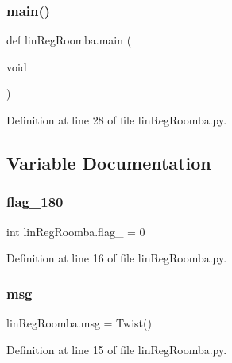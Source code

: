 \mbox{\label{namespacelinRegRoomba_af5e99ac36e42ad425a87275a39d7f297}} 
\subsubsection{\texorpdfstring{main()}{main()}}
{\footnotesize\ttfamily def lin\+Reg\+Roomba.\+main (\begin{DoxyParamCaption}\item[{void}]{ }\end{DoxyParamCaption})}



Definition at line 28 of file lin\+Reg\+Roomba.\+py.



\subsection{Variable Documentation}
\mbox{\label{namespacelinRegRoomba_ab69f9401c1bcd62410c52e043cee85ae}} 
\subsubsection{\texorpdfstring{flag\_180}{flag\_180}}
{\footnotesize\ttfamily int lin\+Reg\+Roomba.\+flag\+\_ = 0}



Definition at line 16 of file lin\+Reg\+Roomba.\+py.

\mbox{\label{namespacelinRegRoomba_a157f27eb0ee84026933a46a45ece071b}} 
\subsubsection{\texorpdfstring{msg}{msg}}
{\footnotesize\ttfamily lin\+Reg\+Roomba.\+msg = Twist()}



Definition at line 15 of file lin\+Reg\+Roomba.\+py.

